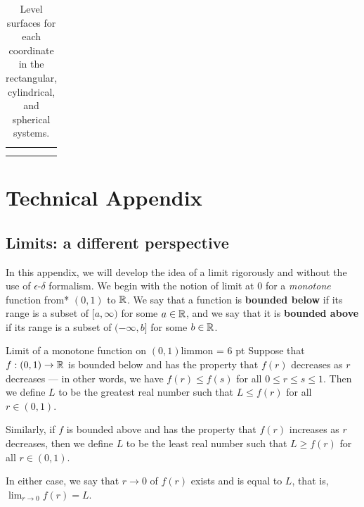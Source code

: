 \documentclass{watsonbook}
\begin{document}
  \begin{table}[h!]
    \centering
    \begin{tabular}{M{4.2cm}|M{4.2cm}|M{4.2cm}}
      \usebox{\xconstantfig} & \usebox{\yconstantfig} & \usebox{\zconstantfig}  \\ \hline
      \usebox{\rconstantfig} & \usebox{\thetaconstantfig}  & \usebox{\zconstantfig}  \\ \hline
      \usebox{\rhoconstantfig} & \usebox{\thetaconstantfig}  & \usebox{\phiconstantfig}  \\ \hline
    \end{tabular}
    \caption{Level surfaces for each coordinate
      in the rectangular, cylindrical, and spherical
      systems. \label{table:coordinateslices}}
  \end{table}

  \newpage

  \section{Technical Appendix}

    \subsection{Limits: a different perspective}
\label{sec:limitsappendix}

In this appendix, we will develop the idea of a limit rigorously and
without the use of $\epsilon$-$\delta$ formalism.  We begin with the
notion of limit at 0 for a \textit{monotone} function from* $(0,1)$ to
$\mathbb{R}$. We say that a function is \textbf{bounded below} if its range is
a subset of $[a,\infty)$ for some $a \in \mathbb{R}$, and we say that it is
\textbf{bounded above} if its range is a subset of $(-\infty,b]$ for
some $b \in \mathbb{R}$. 

\begin{defn}{Limit of a monotone function on $(0,1)$}{limmon} \parskip = 6 pt 
  Suppose that $f:(0,1) \to \mathbb{R}$ is bounded below and has the property
  that $f(r)$ decreases as $r$ decreases --- in other words,
  we have $f(r) \leq f(s)$ for all $0 \leq r \leq s \leq 1$. Then we define
  $L$ to be the greatest real number such that $L \leq f(r)$ for all
  $r\in (0,1)$. 

  Similarly, if $f$ is bounded above and has the property that $f(r)$
  increases as $r$ decreases, then we define $L$ to be the least real
  number such that $L \geq f(r)$ for all $r \in (0,1)$.

  In either case, we say that $r\to0$ of $f(r)$ exists and is equal to
  $L$, that is,  $\displaystyle{\lim_{r\to 0} f(r) = L}$. 
\end{defn}
\end{document}
